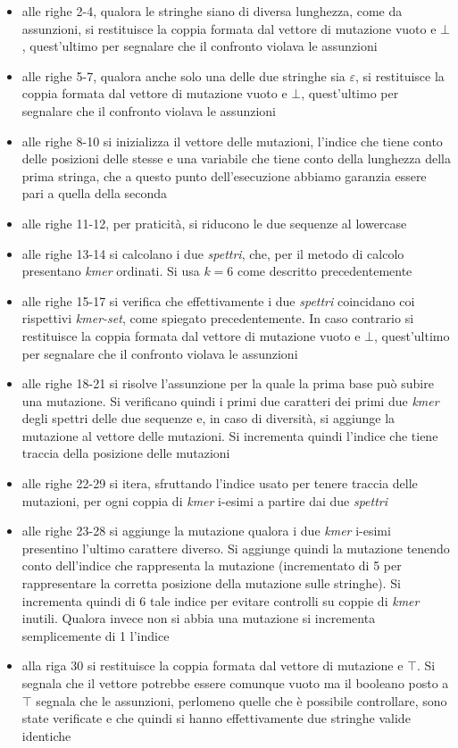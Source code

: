 \documentclass[a4paper,12pt, oneside]{book}
\begin{document}
\begin{itemize}
  \item alle righe 2-4, qualora le stringhe siano di diversa lunghezza, come da
  assunzioni, si restituisce la coppia formata dal vettore di mutazione vuoto e
  $\bot$, quest'ultimo per segnalare che il confronto violava le assunzioni
  \item alle righe 5-7, qualora anche solo una delle due stringhe sia
  $\varepsilon$, si restituisce la coppia formata dal vettore di mutazione vuoto
  e $\bot$, quest'ultimo per segnalare che il confronto violava le assunzioni
  \item alle righe 8-10 si inizializza il vettore delle mutazioni, l'indice che
  tiene conto delle posizioni delle stesse e una variabile che tiene conto della
  lunghezza della prima stringa, che a questo punto dell'esecuzione abbiamo
  garanzia essere pari a quella della seconda
  \item alle righe 11-12, per praticità, si riducono le due sequenze al
  lowercase
  \item alle righe 13-14 si calcolano i due \textit{spettri}, che, per il metodo
  di calcolo presentano \textit{kmer} ordinati. Si usa $k=6$ come descritto
  precedentemente
  \item alle righe 15-17 si verifica che effettivamente i due \textit{spettri}
  coincidano coi rispettivi \textit{kmer-set}, come spiegato precedentemente. In
  caso contrario si restituisce 
  la coppia formata dal vettore di mutazione vuoto e $\bot$, quest'ultimo per
  segnalare che il confronto violava le assunzioni 
  \item alle righe 18-21 si risolve l'assunzione per la quale la prima base può
  subire una mutazione. Si verificano quindi i primi due caratteri dei primi due
  \textit{kmer} degli spettri delle due sequenze e, in caso di diversità, si
  aggiunge la mutazione al vettore delle 
  mutazioni. Si incrementa quindi l'indice che tiene traccia della posizione
  delle mutazioni
  \item alle righe 22-29 si itera, sfruttando l'indice usato per tenere traccia
  delle mutazioni, per ogni coppia di \textit{kmer} i-esimi a
  partire dai due \textit{spettri}
  \item alle righe 23-28 si aggiunge la mutazione qualora i due \textit{kmer}
  i-esimi presentino l'ultimo carattere diverso. Si aggiunge quindi la mutazione
  tenendo conto dell'indice che rappresenta la mutazione (incrementato di 5 per
  rappresentare la corretta posizione della mutazione sulle stringhe). Si
  incrementa quindi di 6 tale indice 
  per evitare controlli su coppie di \textit{kmer} inutili. Qualora invece non
  si abbia una mutazione si incrementa semplicemente di 1 l'indice
  \item alla riga 30 si restituisce la coppia formata dal vettore di
  mutazione e $\top$. Si segnala che il vettore potrebbe essere comunque vuoto
  ma il booleano posto a $\top$ segnala che le assunzioni, perlomeno quelle che
  è possibile controllare, sono state verificate e che quindi si hanno
  effettivamente due stringhe valide identiche
\end{itemize}
\end{document}
